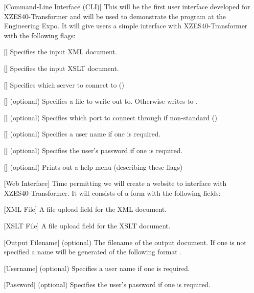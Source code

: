 \begin{description}
  \item {
    [Command-Line Interface (CLI)]
    This will be the first user interface developed for XZES40-Transformer and will be used to demonstrate the program at the Engineering Expo.
    It will give users a simple interface with XZES40-Transformer with the following flags:
    \begin{description}
      \item {
        []
        Specifies the input XML document.
      }
      \item {
        []
        Specifies the input XSLT document.
      }
      \item {
        []
        Specifies which server to connect to ()
      }
      \item {
        [] (optional)
        Specifies a file to write out to.  Otherwise writes to .
      }
      \item {
        [] (optional)
        Specifies which port to connect through if non-standard ()
      }
      \item {
        [] (optional)
        Specifies a user name if one is required.
      }
      \item {
        [] (optional)
        Specifies the user's password if one is required.
      }
      \item {
        [] (optional)
        Prints out a help menu (describing these flags)
      }
    \end{description}
  }
  \item {
    [Web Interface]
    Time permitting we will create a website to interface with XZES40-Transformer.
    It will consists of a form with the following fields:
    \begin{description}
      \item {
        [XML File] A file upload field for the XML document.
      }
      \item {
        [XSLT File] A file upload field for the XSLT document.
      }
      \item {
        [Output Filename] (optional)
        The filename of the output document.
        If one is not specified a name will be generated of the following format .
      }
      \item {
        [Username] (optional)
        Specifies a user name if one is required.
      }
      \item {
        [Password] (optional)
        Specifies the user's password if one is required.
      }
    \end{description}
  }
\end{description}


